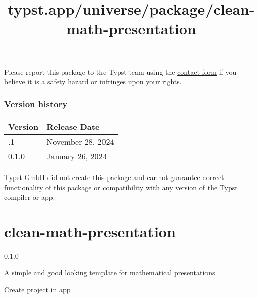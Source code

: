 Please report this package to the Typst team using the
\href{https://typst.app/contact}{contact form} if you believe it is a
safety hazard or infringes upon your rights.

\label{versions}
\subsubsection{Version history}\label{version-history}

\begin{longtable}[]{@{}ll@{}}
\toprule\noalign{}
Version & Release Date \\
\midrule\noalign{}
\endhead
\bottomrule\noalign{}
\endlastfoot
0.1.1 & November 28, 2024 \\
\href{https://typst.app/universe/package/wrap-it/0.1.0/}{0.1.0} &
January 26, 2024 \\
\end{longtable}

Typst GmbH did not create this package and cannot guarantee correct
functionality of this package or compatibility with any version of the
Typst compiler or app.


\title{typst.app/universe/package/clean-math-presentation}

\label{banner}
\label{template-thumbnail}

\section{clean-math-presentation}\label{clean-math-presentation}

{ 0.1.0 }

A simple and good looking template for mathematical presentations

\href{/app?template=clean-math-presentation&version=0.1.0}{Create
project in app}

\label{readme}
\href{https://github.com/JoshuaLampert/clean-math-presentation/actions/workflows/build.yml}{\pandocbounded{}}
\href{https://github.com/JoshuaLampert/clean-math-presentation}{}
\href{https://opensource.org/licenses/MIT}{\pandocbounded{}}


